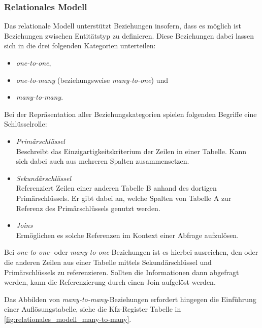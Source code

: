 \subsubsection{Relationales Modell}
Das relationale Modell unterstützt Beziehungen insofern, dass es möglich ist Beziehungen zwischen Entitätstyp zu definieren. Diese Beziehungen dabei lassen sich in die drei folgenden Kategorien unterteilen: 
\begin{itemize}
    \item \textit{one-to-one}, 
    \item \textit{one-to-many} (beziehungsweise \textit{many-to-one}) und 
    \item \textit{many-to-many}.
\end{itemize}

Bei der Repräsentation aller Beziehungskategorien spielen  folgenden Begriffe eine Schlüsselrolle:
\begin{itemize}
    \item \textit{Primärschlüssel}\\
    Beschreibt das Einzigartigkeitskriterium der Zeilen in einer Tabelle. Kann sich dabei auch aus mehreren Spalten zusammensetzen. 
    \item \textit{Sekundärschlüssel}\\
    Referenziert Zeilen einer anderen Tabelle B anhand des dortigen Primärschlüssels. Er gibt dabei an, welche Spalten von Tabelle A zur Referenz des Primärschlüssels genutzt werden. 
    \item \textit{Joins}\\
    Ermöglichen es solche Referenzen im Kontext einer Abfrage aufzulösen.
\end{itemize}

Bei \textit{one-to-one}- oder \textit{many-to-one}-Beziehungen ist es hierbei ausreichen, den oder die anderen Zeilen aus einer Tabelle mittels Sekundärschlüssel und Primärschlüssels zu referenzieren. Sollten die Informationen dann abgefragt werden, kann die Referenzierung durch einen Join aufgelöst werden.

Das Abbilden von \textit{many-to-many}-Beziehungen erfordert hingegen die Einführung einer Auflösungstabelle, siehe die Kfz-Register Tabelle in \autoref{fig:relationales_modell_many-to-many}. 

